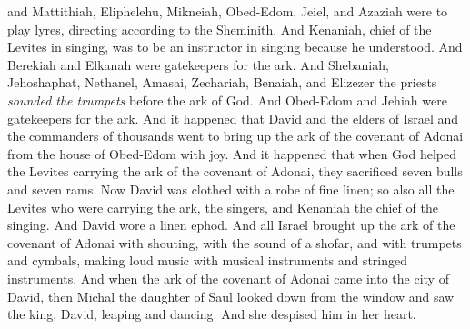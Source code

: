 \begin{biblechapter}
\verse and Mattithiah, Eliphelehu, Mikneiah, Obed-Edom, Jeiel, and Azaziah were to play lyres, directing according to the Sheminith.
\verse And Kenaniah, chief of the Levites in singing, was to be an instructor in singing because he understood.
\verse And Berekiah and Elkanah were gatekeepers for the ark.
\verse And Shebaniah, Jehoshaphat, Nethanel, Amasai, Zechariah, Benaiah, and Elizezer the priests \textit{sounded the trumpets} before the ark of God. And Obed-Edom and Jehiah were gatekeepers for the ark.
\verse And it happened that David and the elders of Israel and the commanders of thousands went to bring up the ark of the covenant of Adonai from the house of Obed-Edom with joy.
\verse And it happened that when God helped the Levites carrying the ark of the covenant of Adonai, they sacrificed seven bulls and seven rams.
\verse Now David was clothed with a robe of fine linen; so also all the Levites who were carrying the ark, the singers, and Kenaniah the chief of the singing. And David wore a linen ephod.
\verse And all Israel brought up the ark of the covenant of Adonai with shouting, with the sound of a shofar, and with trumpets and cymbals, making loud music with musical instruments and stringed instruments.
\verse And when the ark of the covenant of Adonai came into the city of David, then Michal the daughter of Saul looked down from the window and saw the king, David, leaping and dancing. And she despised him in her heart.
\end{biblechapter}


